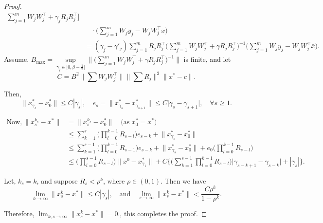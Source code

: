 \documentclass[10pt,a4paper]{amsart}
\begin{document}
\begin{proof}
\begin{align*}
{ \sum_{j=1}^m W_j W_j^\top + \gamma_j R_j R_j^\top } \Big] \\
&\quad \cdot \Big( \sum_{j=1}^{m} W_j y_j - W_j W_j^\top \bar{x} \Big) \\
&= (\gamma_j - \gamma'_j) \sum_{j=1}^{m} R_j R_j^\top 
\Big( \sum_{j=1}^{m} W_j W_j^\top + \gamma R_j R_j^\top \Big)^{-1} 
\Big( \sum_{j=1}^{m} W_j y_j - W_j W_j^\top \bar{x} \Big).
\end{align*}
Assume, $ B_{\max} = \sup\limits_{\gamma_j \in \Big[0, \beta - \tfrac{1}{2} \Big]} 
\Big\| \Big( \sum_{j=1}^{m} W_j W_j^\top + \gamma R_j R_j^\top \Big)^{-1} \Big\| $ is finite, and let 
\[
C = B^2 \Big\| \sum W_j W_j^\top \Big\| \Big\| \sum R_j \Big\|^2 \Big\| x^* - c \Big\|.
\]

Then,
\[
\Big\| x^*_{\gamma_s} - x_0^* \Big\| \leq C |\gamma_s|, \quad 
e_s = \Big\| x^*_{\gamma_s} - x^*_{\gamma_{s+1}} \Big\| \leq C \Big| \gamma_s - \gamma_{s+1} \Big|, \quad \forall s \geq 1.
\]


\begin{align*}
\text{Now,}~\Big\| x_s^{k_s} - x^* \Big\| 
&= \Big\| x_s^{k_s} - x^*_0 \Big\| \quad \text{(as } x_0^* = x^* \text{)} \\
&\leq \sum_{k=1}^{s} \Big( \prod_{l=0}^{k-1} R_{s-l} \Big) e_{s-k} + \Big\| x^*_{\gamma_s} - x_0^* \Big\| \\
&\leq \sum_{k=1}^{s-1} \Big( \prod_{l=0}^{k-1} R_{s-1} \Big) e_{s-k} + \Big\| x^*_{\gamma_s} - x_0^* \Big\| + e_0 \Big( \prod_{l=0}^{k-1} R_{s-l} \Big) \\
&\leq \Big( \prod_{l=0}^{s-1} R_{s-l} \Big) \Big\| x^{0} - x_{\gamma_1}^* \Big\| + 
C \Big\{ \Big( \sum_{k=1}^{s-1} \prod_{l=0}^{k-1} R_{s-l} \Big) \Big| \gamma_{s-k+1} - \gamma_{s-k} \Big| + |\gamma_s| \Big\}.
\end{align*}

Let, $ k_s = k $, and suppose $ R_s < \rho^k $, where $ \rho \in (0,1) $. Then we have
\[
\lim_{k \to \infty} \Big\| x_s^{k} - x^* \Big\| \leq C |\gamma_s|, \quad 
\text{and} \quad 
\lim_{s \to \infty} \Big\| x_s^{k} - x^* \Big\| < \frac{C \rho^k}{1 - \rho^k}.
\]

Therefore, 
\(
\lim_{k,s \to \infty} \Big\| x_s^{k} - x^* \Big\| = 0.
\), this completes the proof.
\end{proof}
\end{document}
